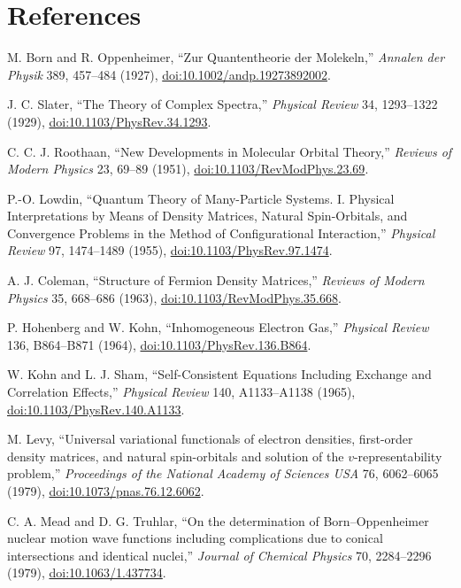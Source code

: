 \documentclass[11pt,a4paper]{article}
\theoremstyle{definition}
\theoremstyle{plain}
\theoremstyle{remark}
\begin{document}
\clearpage
\section*{References}
\begingroup
\raggedright
\begin{enumerate}[label={[\arabic*]},leftmargin=*,itemsep=3pt]
\item M. Born and R. Oppenheimer, ``Zur Quantentheorie der
Molekeln,'' \emph{Annalen der Physik} 389, 457--484 (1927),
\href{https://doi.org/10.1002/andp.19273892002}
{doi:10.1002/andp.19273892002}.
\item J. C. Slater, ``The Theory of Complex Spectra,''
\emph{Physical Review} 34, 1293--1322 (1929),
\href{https://doi.org/10.1103/PhysRev.34.1293}
{doi:10.1103/PhysRev.34.1293}.
\item C. C. J. Roothaan, ``New Developments in Molecular Orbital
Theory,'' \emph{Reviews of Modern Physics} 23, 69--89 (1951),
\href{https://doi.org/10.1103/RevModPhys.23.69}
{doi:10.1103/RevModPhys.23.69}.
\item P.-O. Lowdin, ``Quantum Theory of Many-Particle Systems. I.
Physical Interpretations by Means of Density Matrices, Natural
Spin-Orbitals, and Convergence Problems in the Method of
Configurational Interaction,'' \emph{Physical Review} 97, 1474--1489
(1955),
\href{https://doi.org/10.1103/PhysRev.97.1474}
{doi:10.1103/PhysRev.97.1474}.
\item A. J. Coleman, ``Structure of Fermion Density Matrices,''
\emph{Reviews of Modern Physics} 35, 668--686 (1963),
\href{https://doi.org/10.1103/RevModPhys.35.668}
{doi:10.1103/RevModPhys.35.668}.
\item P. Hohenberg and W. Kohn, ``Inhomogeneous Electron Gas,''
\emph{Physical Review} 136, B864--B871 (1964),
\href{https://doi.org/10.1103/PhysRev.136.B864}
{doi:10.1103/PhysRev.136.B864}.
\item W. Kohn and L. J. Sham, ``Self-Consistent Equations Including
Exchange and Correlation Effects,'' \emph{Physical Review} 140,
A1133--A1138 (1965),
\href{https://doi.org/10.1103/PhysRev.140.A1133}
{doi:10.1103/PhysRev.140.A1133}.
\item M. Levy, ``Universal variational functionals of electron
densities, first-order density matrices, and natural spin-orbitals
and solution of the \(v\)-representability problem,''
\emph{Proceedings of the National Academy of Sciences USA} 76,
6062--6065 (1979),
\href{https://doi.org/10.1073/pnas.76.12.6062}
{doi:10.1073/pnas.76.12.6062}.
\item C. A. Mead and D. G. Truhlar, ``On the determination of
Born--Oppenheimer nuclear motion wave functions including
complications due to conical intersections and identical nuclei,''
\emph{Journal of Chemical Physics} 70, 2284--2296 (1979),
\href{https://doi.org/10.1063/1.437734}
{doi:10.1063/1.437734}.
\end{enumerate}
\endgroup
\end{document}
